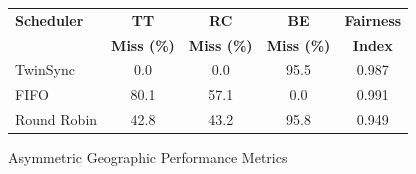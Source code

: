 
\begin{figure}[!t]
\centering
\footnotesize
\begin{tabular}{@{}lcccc@{}}
\toprule
\textbf{Scheduler} & \textbf{TT} & \textbf{RC} & \textbf{BE} & \textbf{Fairness} \\
& \textbf{Miss (\%)} & \textbf{Miss (\%)} & \textbf{Miss (\%)} & \textbf{Index} \\
\midrule
TwinSync & 0.0 & 0.0 & 95.5 & 0.987 \\
FIFO & 80.1 & 57.1 & 0.0 & 0.991 \\
Round Robin & 42.8 & 43.2 & 95.8 & 0.949 \\
\bottomrule
\end{tabular}
\caption{Asymmetric Geographic Performance Metrics}
\label{fig:asymmetric_results}
\vspace{-0.3cm}
\end{figure}
